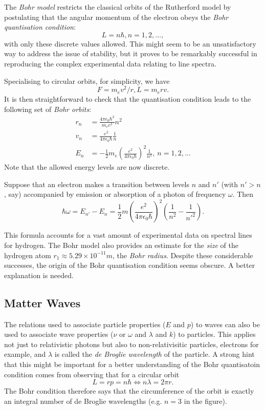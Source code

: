 \documentclass[a4paper]{article}
\theoremstyle{definition}
\begin{document}
The \emph{Bohr model} restricts the classical orbits of the Rutherford model by postulating that the angular momentum of the electron obeys the \emph{Bohr quantisation condition}:
\[
  L = n\hbar, n=1,2,\ldots,
\]
with only these discrete values allowed. This might seem to be an unsatisfactory way to address the issue of stability, but it proves to be remarkably successful in reproducing the complex experimental data relating to line spectra.

Specialising to circular orbits, for simplicity, we have
\[
  F=m_e v^2/r, L=m_e rv.
\]
It is then straightforward to check that the quantisation condition leads to the following set of \emph{Bohr orbits}:
\begin{align*}
  r_n &= \frac{4\pi\epsilon_0\hbar^2}{m_e e^2}n^2 \\
  v_n &= \frac{e^2}{4\pi\epsilon_0\hbar}\frac{1}{n} \\
  E_n &= -\frac{1}{2}m_e (\frac{e^2}{4\pi\epsilon_0\hbar})^2\frac{1}{n^2},\: n =1,2,\ldots
\end{align*}
Note that the allowed energy levels are now discrete.

Suppose that an electron makes a transition between levels $n$ and $n'$ (with $n' > n$, say) accompanied by emission or absorption of a photon of frequency $\omega$. Then
\[
  \hbar\omega = E_{n'} - E_n = \frac{1}{2}m(\frac{e^2}{4\pi\epsilon_0\hbar})^2 (\frac{1}{n^2} - \frac{1}{n'^2}).
\]

This formula accounts for a vast amount of experimental data on spectral lines for hydrogen. The Bohr model also provides an estimate for the \emph{size} of the hydrogen atom $r_1 \approx 5.29\times 10^{-11} m$, the \emph{Bohr radius}. Despite these considerable successes, the origin of the Bohr quantisation condition seems obscure. A better explanation is needed.

\subsection{Matter Waves}

The relations used to associate particle properties ($E$ and $p$) to waves can also be used to associate wave properties ($\nu$ or $\omega$ and $\lambda$ and $k$) to particles. This applies not just to relativistic photons but also to non-relativisitic particles, electrons for example, and $\lambda$ is called the \emph{de Broglie wavelength} of the particle. A strong hint that this might be important for a better understanding of the Bohr quantisatoin condition comes from observing that for a circular orbit
\[
  L = rp = n\hbar \Leftrightarrow n\lambda = 2\pi r.
\]
The Bohr condition therefore says that the circumference of the orbit is exactly an integral number of de Broglie wavelengths (e.g. $n=3$ in the figure).
\end{document}
